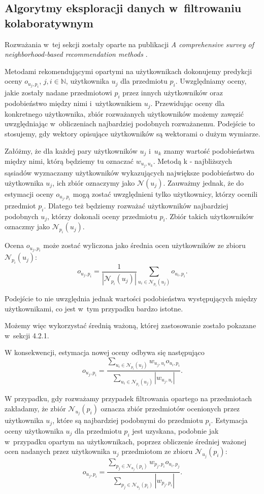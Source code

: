 \documentclass[12pt,a4paper]{report}
\newcommand{\setN}{\mathbb{N}}
\begin{document}
\subsection{Algorytmy eksploracji danych w~filtrowaniu kolaboratywnym}
Rozważania w~tej sekcji zostały oparte na publikacji \textit{A comprehensive survey of neighborhood-based recommendation methods} {\citep[Sec 2.1]{acsonbrs}}.

Metodami rekomendującymi opartymi na użytkownikach dokonujemy predykcji oceny $o_{u_j,p_i}$, $ j,i \in \setN$, użytkownika $u_j$ dla przedmiotu $p_i$. Uwzględniamy oceny, jakie zostały nadane przedmiotowi $p_i$ przez innych użytkowników oraz podobieństwo między nimi i~użytkownikiem $u_j$.
Przewidując oceny dla konkretnego użytkownika, zbiór rozważanych użytkowników możemy zawęzić uwzględniając w~obliczeniach najbardziej podobnych rozważanemu. Podejście to stosujemy, gdy wektory opisujące użytkowników są wektorami o dużym wymiarze.

Załóżmy, że dla każdej pary użytkowników $u_j$ i~$u_k$ znamy wartość podobieństwa między nimi, którą będziemy tu oznaczać $w_{u_j,u_k}$. Metodą k - najbliższych sąsiadów wyznaczamy użytkowników wykazujących największe podobieństwo do użytkownika $u_j$, ich zbiór oznaczymy jako $\mathcal{N}(u_j)$. Zauważmy jednak, że do estymacji oceny $o_{u_j,p_i}$ mogą zostać uwzględnieni tylko użytkownicy, którzy ocenili przedmiot $p_i$. Dlatego też będziemy rozważać użytkowników najbardziej podobnych $u_j$, którzy dokonali oceny przedmiotu $p_i$. Zbiór takich użytkowników oznaczmy jako $\mathcal{N}_{p_i}(u_j)$.

Ocena $o_{u_j,p_i}$ może zostać wyliczona jako średnia ocen użytkowników ze zbioru $\mathcal{N}_{p_i}(u_j)$:
$$
o_{u_j,p_i} = \frac{1}{|\mathcal{N}_{p_i}(u_j)|} \sum_{u_i \in \mathcal{N}_{p_i}(u_j)} o_{u_i,p_i}.
$$

Podejście to nie uwzględnia jednak wartości podobieństwa występujących między użytkownikami, co jest w~tym przypadku bardzo istotne.

Możemy więc wykorzystać średnią ważoną, której zastosowanie zostało pokazane w~sekcji 4.2.1.

W konsekwencji, estymacja nowej oceny odbywa się następująco
$$
o_{u_j,p_i} = \frac{\sum_{u_i \in \mathcal{N}_{p_i}(u_j)} w_{u_j,u_i} o_{u_i,p_i}}{\sum_{u_i \in \mathcal{N}_{p_i}(u_j)} |w_{u_j,u_i}|}.
$$

W przypadku, gdy rozważamy przypadek filtrowania opartego na przedmiotach zakładamy, że zbiór $\mathcal{N}_{u_j}(p_i)$ oznacza zbiór przedmiotów ocenionych przez użytkownika $u_j$, które są najbardziej podobnymi do przedmiotu $p_i$. Estymacja oceny użytkownika $u_j$ dla przedmiotu $p_i$ jest uzyskana, podobnie jak w~przypadku opartym na użytkownikach, poprzez obliczenie średniej ważonej ocen nadanych przez użytkownika $u_j$ przedmiotom ze zbioru $\mathcal{N}_{u_j}(p_i)$:
$$
o_{u_j,p_i} = \frac{\sum_{p_j \in \mathcal{N}_{u_j}(p_i)} w_{p_j,p_i} o_{u_i,p_j}}{\sum_{p_j \in \mathcal{N}_{u_j}(p_i)} |w_{p_j,p_i}|}.
$$
\end{document}
